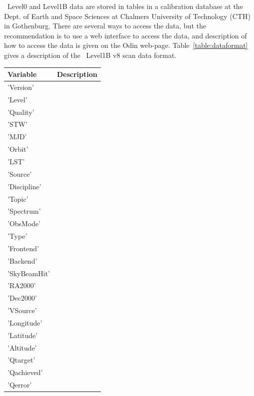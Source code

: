 \smr\ Level0 and Level1B data are stored in tables
in a calibration database at the Dept. of Earth and Space
Sciences at Chalmers University of Technology (CTH) in Gothenburg.
There are several ways to access the data, but the recommendation is to use a web 
interface to access the data, and description of how to access the data
is given on the Odin web-page. Table~\ref{table:dataformat} gives a description 
of the \smr\ Level1B v8 scan data format.

\begin{longtable}{| p{} | p{} |} 
\hline
  \textbf{Variable} & \textbf{Description} \\
  \hline
  'Version'         & \\ \hline
  'Level'           & \\ \hline
     'Quality'         & \\ \hline
     'STW'             & \\ \hline
     'MJD'             & \\ \hline
     'Orbit'           & \\ \hline
     'LST'             & \\ \hline
     'Source'          & \\ \hline
     'Discipline'      & \\ \hline
     'Topic'          & \\ \hline
     'Spectrum'        & \\    \hline
     'ObsMode'        & \\ \hline
     'Type'            & \\ \hline
     'Frontend'       & \\ \hline
     'Backend'       & \\ \hline
     'SkyBeamHit'      & \\ \hline
     'RA2000'        & \\ \hline
     'Dec2000'        & \\ \hline
     'VSource'         & \\ \hline
     'Longitude'    & \\ \hline
     'Latitude'        & \\ \hline
     'Altitude'        & \\ \hline
     'Qtarget'       & \\ \hline
     'Qachieved'      & \\ \hline
     'Qerror'         & \\ \hline

\end{longtable}
